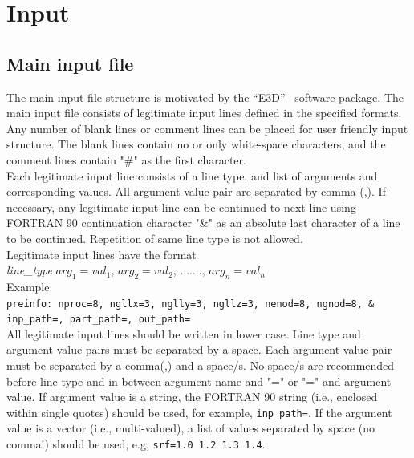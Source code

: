 \chapter{Input}
\label{chap:input}
\section{Main input file}

The main input file structure is motivated by the ``E3D''~\citep{larsen1995} software package. The main input file consists of legitimate input lines defined in the specified formats. Any number of blank lines or comment lines can be placed for user friendly input structure. The blank lines contain no or only white-space characters, and the comment lines contain "\#" as the first character. \\

Each legitimate input line consists of a line type, and list of arguments and corresponding values. All argument-value pair are separated by comma (,). If necessary, any legitimate input line can be continued to next line using FORTRAN 90 continuation  character "\&" as an absolute last character of a line to be continued. Repetition of same line type is not allowed.\\

Legitimate input lines have the format\\
{\it{line\_type}} $arg_1=val_1$, $arg_2=val_2$, ......., $arg_n=val_n$\\

Example:\\
\texttt{preinfo: nproc=8, ngllx=3, nglly=3, ngllz=3, nenod=8, ngnod=8, \& \\
inp\_path=, part\_path=, out\_path=}\\

All legitimate input lines should be written in lower case. Line type and argument-value pairs must be separated by a space. Each argument-value pair must be separated by a comma(,) and a space/s. No space/s are recommended before line type and in between argument name and "=" or "=" and argument value. If argument value is a string, the FORTRAN 90 string (i.e., enclosed within single quotes) should be used, for example, \texttt{inp\_path=}. If the argument value is a vector (i.e., multi-valued), a list of values separated by space (no comma!) should be used, e.g, \texttt{srf=1.0 1.2 1.3 1.4}.

